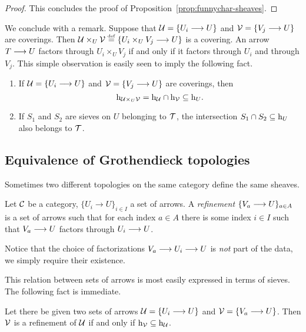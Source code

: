 \begin{2   CONTRAVARIANT FUNCTORS}
\begin{2.3 Sheaves in Grothendieck topologies}
\begin{proof}
This concludes the proof of Proposition~\ref{prop:funnychar-sheaves}.
\end{proof}

We conclude with a remark. Suppose that $\mathcal{U} = \{U_{i}\longrightarrow U\}$ and $\mathcal{V} = \{V_{j}\longrightarrow U\}$ are coverings. Then $\mathcal{U} \times_{U} \mathcal{V} \overset{\mathrm{\scriptscriptstyle def}} = \{U_{i}\times_{U} V_{j}\longrightarrow U\}$ is a covering. An arrow $T \arr U$ factors through $U_{i}\times_{U} V_{j}$ if and only if it factors through $U_{i}$ and through $V_{j}$. This simple observation is easily seen to imply the following fact.

\begin{proposition}\label{prop:directed-sieves}\hfil
\begin{enumerate}

\item If $\mathcal{U} = \{U_{i}\longrightarrow U\}$ and $\mathcal{V} = \{V_{j}\longrightarrow U\}$ are coverings, then
   \[
   \mathrm{h}_{\mathcal{U} \times_{U} \mathcal{V}} = \mathrm{h}_{\mathcal{U}} \cap \mathrm{h}_{\mathcal{V}} \subseteq \mathrm{h}_{U}.
   \]

\item If $S_{1}$ and $S_{2}$ are sieves on $U$ belonging to $\mathcal{T}$, the intersection $S_{1} \cap S_{2} \subseteq \mathrm{h}_{U}$ also belongs to $\mathcal{T}$.
\end{enumerate}

\end{proposition}




\subsection{Equivalence of Grothendieck topologies}

Sometimes two different to\-pol\-ogies on the same category define the same sheaves.

\begin{definition}
Let $\mathcal{C}$ be a category, $\{U_i \to U\}_{i \in I}$ a set of arrows. A \emph{refinement} $\{V_a \arr U\}_{a \in A}$ is a set of arrows such that for each index $a \in A$ there is some index $i \in I$ such that $V_a \arr U$ factors through $U_i \arr U$.
\end{definition}

Notice that the choice of factorizations $V_a \arr U_i \arr U$ is \emph{not} part of the data, we simply require their existence.

This relation between sets of arrows is most easily expressed in terms of sieves. The following fact is immediate.

\begin{proposition}\label{prop:funnychar-refinement}
Let there be given two sets of arrows $\mathcal{U} = \{U_i \longrightarrow U\}$ and $\cV = \{V_a \arr U\}$. Then $\mathcal{V}$ is a refinement of $\mathcal{U}$ if and only if $\mathrm{h}_{\mathcal{V}} \subseteq \mathrm{h}_{\mathcal{U}}$.
\end{proposition}


\end{2.3 Sheaves in Grothendieck topologies}
\end{2   CONTRAVARIANT FUNCTORS}
